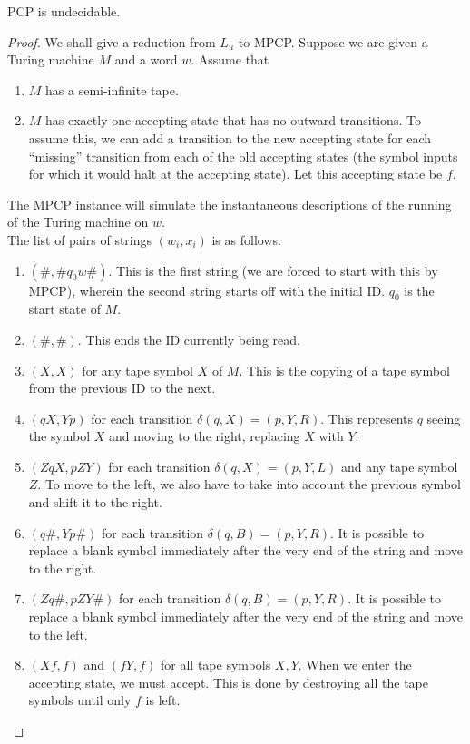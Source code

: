 	\begin{ftheo}
		\label{ftheo: pcp is undecidable}
		\textsf{PCP} is undecidable.
	\end{ftheo}
	\begin{proof}
		We shall give a reduction from $L_u$ to \textsf{MPCP}. Suppose we are given a Turing machine $M$ and a word $w$. Assume that
		\begin{enumerate}
			\item $M$ has a semi-infinite tape.
			\item $M$ has exactly one accepting state that has no outward transitions. To assume this, we can add a transition to the new accepting state for each ``missing'' transition from each of the old accepting states (the symbol inputs for which it would halt at the accepting state). Let this accepting state be $f$.  
		\end{enumerate}
		The \textsf{MPCP} instance will simulate the instantaneous descriptions of the running of the Turing machine on $w$.\\
		The list of pairs of strings $(w_i,x_i)$ is as follows.
		\begin{enumerate}
			\item $(\#,\#q_0w\#)$. This is the first string (we are forced to start with this by \textsf{MPCP}), wherein the second string starts off with the initial ID. $q_0$ is the start state of $M$.
			\item $(\#,\#)$. This ends the ID currently being read.
			\item $(X,X)$ for any tape symbol $X$ of $M$. This is the copying of a tape symbol from the previous ID to the next.
			\item $(qX,Yp)$ for each transition $\delta(q,X) = (p,Y,R)$. This represents $q$ seeing the symbol $X$ and moving to the right, replacing $X$ with $Y$.
			\item $(ZqX,pZY)$ for each transition $\delta(q,X) = (p,Y,L)$ and any tape symbol $Z$. To move to the left, we also have to take into account the previous symbol and shift it to the right.
			\item $(q\#,Yp\#)$ for each transition $\delta(q,B) = (p,Y,R)$. It is possible to replace a blank symbol immediately after the very end of the string and move to the right.
			\item $(Zq\#,pZY\#)$ for each transition $\delta(q,B) = (p,Y,R)$. It is possible to replace a blank symbol immediately after the very end of the string and move to the left.
			\item $(Xf,f)$ and $(fY,f)$ for all tape symbols $X,Y$. When we enter the accepting state, we must accept. This is done by destroying all the tape symbols until only $f$ is left.

\end{enumerate}
\end{proof}
